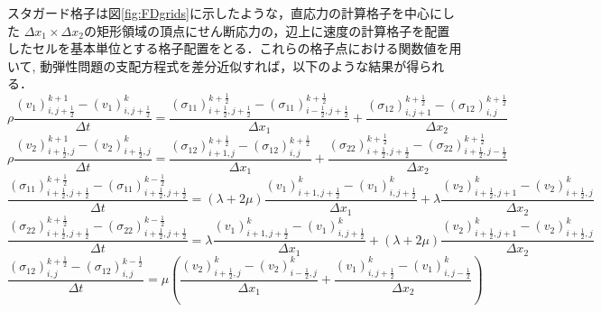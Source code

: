 スタガード格子は図\ref{fig:FDgrids}に示したような，直応力の計算格子を中心にした
$\Delta x_1 \times \Delta x_2$の矩形領域の頂点にせん断応力の，辺上に速度の計算格子を配置したセルを基本単位とする格子配置をとる．これらの格子点における関数値を用いて, 動弾性問題の支配方程式を差分近似すれば，以下のような結果が得られる．
\begin{equation}
	\rho \frac{(v_1)_{i,j+\frac{1}{2}}^{k+1}-(v_1)^k_{i,j+\frac{1}{2}}}{\Delta t}
	=
	\frac{ 
		(\sigma_{11})^{k+\frac{1}{2}}_{i+\frac{1}{2},j+\frac{1}{2}}
		-(\sigma_{11})^{k+\frac{1}{2}}_{i-\frac{1}{2},j+\frac{1}{2}} 
	}
	{\Delta x_1}
	+
	\frac{(\sigma_{12})^{k+\frac{1}{2}}_{i,j+1}-(\sigma_{12})^{k+\frac{1}{2}}_{i,j}}{\Delta x_2}
	\label{eqn:fdtd_v1}
\end{equation}
\begin{equation}
	\rho \frac{(v_2)_{i+\frac{1}{2},j}^{k+1}-(v_2)^k_{i+\frac{1}{2},j}}{\Delta t}
	=
	\frac{(\sigma_{12})^{k+\frac{1}{2}}_{i+1,j}-(\sigma_{12})^{k+\frac{1}{2}}_{i,j}}{\Delta x_1}
	+
	\frac{ 
		(\sigma_{22})^{k+\frac{1}{2}}_{i+\frac{1}{2},j+\frac{1}{2}}
		-(\sigma_{22})^{k+\frac{1}{2}}_{i+\frac{1}{2},j-\frac{1}{2}} 
	}
	{\Delta x_2}
	\label{eqn:fdtd_v2}
\end{equation}
\begin{equation}
	\frac{
		 (\sigma_{11})^{k+\frac{1}{2}}_{i+\frac{1}{2},j+\frac{1}{2}}
		-
		 (\sigma_{11})^{k-\frac{1}{2}}_{i+\frac{1}{2},j+\frac{1}{2}}
	}
	{\Delta t}
	=
	\left( \lambda+2\mu \right)
	\frac{
		(v_1)^{k}_{i+1,j+\frac{1}{2}} - (v_1)^{k}_{i,j+\frac{1}{2}} 
	}
	{\Delta x_1}
	+
	\lambda
	\frac{
		(v_2)^{k}_{i+\frac{1}{2}, j+1} - (v_2)^{k}_{i+\frac{1}{2},j} 
	}
	{\Delta x_2}
	\label{eqn:fdtd_s11}
\end{equation}
\begin{equation}
	\frac{
		 (\sigma_{22})^{k+\frac{1}{2}}_{i+\frac{1}{2},j+\frac{1}{2}}
		-
		 (\sigma_{22})^{k-\frac{1}{2}}_{i+\frac{1}{2},j+\frac{1}{2}}
	}
	{\Delta t}
	=
	\lambda
	\frac{
		(v_1)^{k}_{i+1,j+\frac{1}{2}} - (v_1)^{k}_{i,j+\frac{1}{2}} 
	}
	{\Delta x_1}
	+
	\left( \lambda+2\mu \right)
	\frac{
		(v_2)^{k}_{i+\frac{1}{2}, j+1} - (v_2)^{k}_{i+\frac{1}{2},j} 
	}
	{\Delta x_2}
	\label{eqn:fdtd_s22}
\end{equation}
\begin{equation}
	\frac{
		 (\sigma_{12})^{k+\frac{1}{2}}_{i,j}
		-
		 (\sigma_{12})^{k-\frac{1}{2}}_{i,j}
	}
	{\Delta t}
	=
	\mu \left(
		\frac{
			(v_2)^{k}_{i+\frac{1}{2},j}
			-
			(v_2)^{k}_{i-\frac{1}{2},j}
		}
		{\Delta x_1}
		+
		\frac{
			(v_1)^{k}_{i,j+\frac{1}{2}}
			-
			(v_1)^{k}_{i,j-\frac{1}{2}}
		}
		{\Delta x_2}
	\right)	
	\label{eqn:fdtd_s12}
\end{equation}
